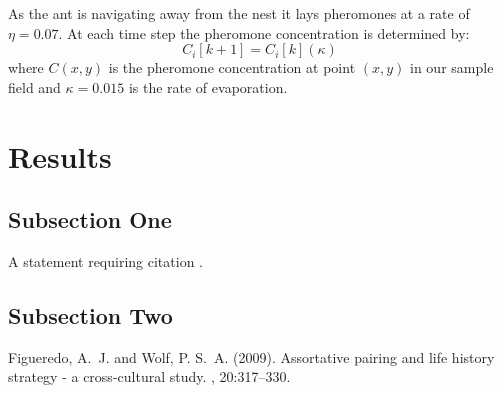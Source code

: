 \documentclass[twoside,twocolumn]{article}
\begin{document}
As the ant is navigating away from the nest it lays pheromones at a rate of $\eta = 0.07$. At each time step the pheromone concentration is determined by: 
\begin{equation}
  \label{eq:p_dep}
  C_i[k+1]=C_i[k](\kappa) 
\end{equation}
where $C(x,y)$ is the pheromone concentration at point $(x,y)$ in our sample field and $\kappa = 0.015$ is the rate of evaporation. 




\section{Results}

\subsection{Subsection One}

A statement requiring citation \cite{Figueredo:2009dg}.
\blindtext %

\subsection{Subsection Two}

\blindtext %


\begin{thebibliography}{99} %

Figueredo, A.~J. and Wolf, P. S.~A. (2009).
\newblock Assortative pairing and life history strategy - a cross-cultural
  study.
, 20:317--330.
 
\end{thebibliography}

\end{document}
